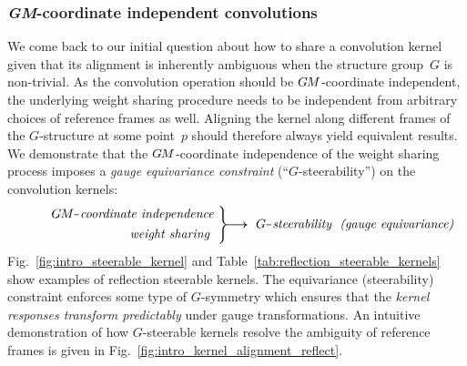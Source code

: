 \subsubsection{\textit{GM}-coordinate independent convolutions}
We come back to our initial question
about how to share a convolution kernel given that its alignment is inherently ambiguous when the structure group~$G$ is non-trivial.
As the convolution operation should be $G\mkern-1.4muM$-coordinate independent, the underlying weight sharing procedure needs to be independent from arbitrary choices of reference frames as well.
Aligning the kernel along different frames of the $G$-structure at some point~$p$ should therefore always yield equivalent results.
We demonstrate that the $G\mkern-1.4muM$-coordinate independence of the weight sharing process imposes a \emph{gauge equivariance constraint} (``$G$-steerability'') on the convolution kernels:
\begin{align*}
    \qquad
    \begin{array}{r@{}}
        \GM \mkern.0mu \rule[2.25pt]{4pt}{.5pt} \mkern1.5mu \textit{coordinate independence}\ \ \\[4pt]
        \textit{weight sharing}\ \ 
    \end{array}
    \Bigg\}
    \mkern-10mu \boldsymbol{\longrightarrow}
    \ G \mkern.75mu \rule[2.25pt]{4pt}{.5pt} \mkern1.5mu \textit{steerability}\ \ \textit{(gauge equivariance)}
\end{align*}
Fig.~\ref{fig:intro_steerable_kernel} and Table~\ref{tab:reflection_steerable_kernels} show examples of reflection steerable kernels.
The equivariance (steerability) constraint enforces some type of $G$-symmetry which ensures that the \emph{kernel responses transform predictably} under gauge transformations.
An intuitive demonstration of how $G$-steerable kernels resolve the ambiguity of reference frames is given in Fig.~\ref{fig:intro_kernel_alignment_reflect}.


